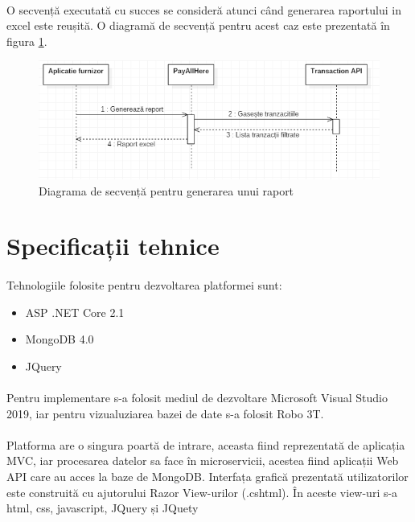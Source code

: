 \documentclass[12pt]{report}
\begin{document}
  	\paragraph{}O secvență executată cu succes se consideră atunci când generarea raportului in excel este reușită. O diagramă de secvență pentru acest caz este prezentată în figura \ref{furnizorseq}. 
  	\begin{figure}[h]
  	\centering
  	\includegraphics[scale=0.9]{furnizorseq}
	\caption{Diagrama de secvență pentru generarea unui raport}  
	\label{furnizorseq}
  	\end{figure}
  	\section{Specificații tehnice}
  	\paragraph{}Tehnologiile folosite pentru dezvoltarea platformei sunt:
  	\begin{itemize}
  	\item ASP .NET Core 2.1
  	\item MongoDB 4.0
  	\item JQuery
  	\end{itemize}
	\paragraph{}Pentru implementare s-a folosit mediul de dezvoltare Microsoft Visual Studio 2019, iar pentru vizualuziarea bazei de date s-a folosit Robo 3T.   	
	\paragraph{}Platforma are o singura poartă de intrare, aceasta fiind reprezentată de aplicația MVC, iar procesarea datelor sa face în microservicii, acestea fiind aplicații Web API care au acces la baze de MongoDB. Interfața grafică prezentată utilizatorilor este construită cu ajutorului Razor View-urilor (.cshtml). În aceste view-uri s-a html, css, javascript, JQuery și JQuety
\end{document}

